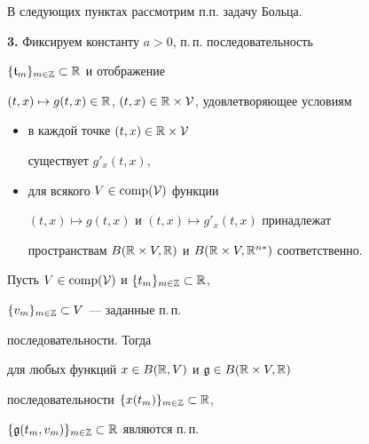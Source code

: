 В следующих пунктах рассмотрим п.п. задачу Больца.


\medskip





\addtocounter{section}{1}


\setcounter{equation}{0}


\setcounter{thms}{0}


\setcounter{lems}{0}


\setcounter{defns}{0}





{\bf 3.} Фиксируем константу $a>0$, п.\,п. последовательность


$\{\frak t_m\}_{m\in\Bbb Z}\subset\Bbb R$ и отображение\linebreak


$(t,x)\mapsto g(t,x)\in\Bbb R$, $(t,x)\in\Bbb


R\times\cal V$, удовлетворяющее условиям


\begin{itemize}


\item[I)] в каждой точке $(t,x)\in\Bbb R\times\cal V$


существует $g'_{x}(t,x)$,


\item[II)] для всякого $V\in\operatorname{comp}(\cal V)$ функции


$(t,x)\mapsto g(t,x)$ и $(t,x)\mapsto g'_x(t,x)$ принадлежат


пространствам $B(\Bbb R\times V,\Bbb R)$ и $B(\Bbb


R\times V,\Bbb R^{n*})$ соответственно.


\end{itemize}





\begin{lems}


Пусть $V\in\operatorname{comp}(\cal V)$ и $\{t_m\}_{m\in\Bbb Z}\subset\Bbb R$,


$\{v_m\}_{m\in\Bbb Z}\subset V$ --- заданные п.\,п.


последовательности. Тогда


для любых функций $x\in B(\Bbb R,V)$ и $\frak g\in


B(\Bbb R\times V,\Bbb R)$


последовательности $\{x(t_m)\}_{m\in\Bbb Z}\subset\Bbb R$,


$\{\frak g(t_m,v_m)\}_{m\in\Bbb Z}\subset\Bbb R$ являются п.\,п.


\end{lems}





